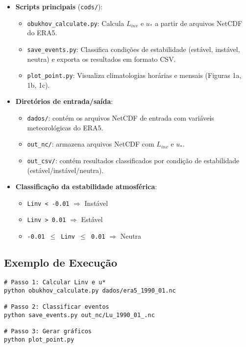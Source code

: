 \documentclass[12pt]{article}
\begin{document}
\begin{itemize}
    \item \textbf{Scripts principais} (\texttt{cods/}):
    \begin{itemize}
        \item \texttt{obukhov\_calculate.py}: Calcula $L_{inv}$ e $u_*$ a partir de arquivos NetCDF do ERA5.
        \item \texttt{save\_events.py}: Classifica condições de estabilidade (estável, instável, neutra) e exporta os resultados em formato CSV.
        \item \texttt{plot\_point.py}: Visualiza climatologias horárias e mensais (Figuras 1a, 1b, 1c).
    \end{itemize}

    \item \textbf{Diretórios de entrada/saída}:
    \begin{itemize}
        \item \texttt{dados/}: contém os arquivos NetCDF de entrada com variáveis meteorológicas do ERA5.
        \item \texttt{out\_nc/}: armazena arquivos NetCDF com $L_{inv}$ e $u_*$.
        \item \texttt{out\_csv/}: contém resultados classificados por condição de estabilidade (estável/instável/neutra).
    \end{itemize}

    \item \textbf{Classificação da estabilidade atmosférica}:
    \begin{itemize}
        \item \texttt{Linv < -0.01} $\Rightarrow$ Instável
        \item \texttt{Linv > 0.01} $\Rightarrow$ Estável
        \item \texttt{-0.01 $\leq$ Linv $\leq$ 0.01} $\Rightarrow$ Neutra
    \end{itemize}
\end{itemize}

\subsection{Exemplo de Execução}  
\label{subsec:exemplo}  

\begin{verbatim}  
# Passo 1: Calcular Linv e u*  
python obukhov_calculate.py dados/era5_1990_01.nc  

# Passo 2: Classificar eventos  
python save_events.py out_nc/Lu_1990_01_.nc  

# Passo 3: Gerar gráficos  
python plot_point.py  
\end{verbatim}  
\end{document}
